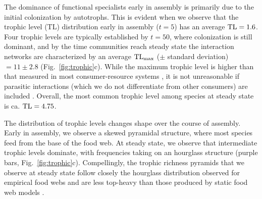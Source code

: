 \documentclass[twocolumn,preprintnumbers,amsmath,amssymb,superscriptaddress,linenumbers]{revtex4-1}
\begin{document}
\begin{bibunit}


The dominance of functional specialists early in assembly is primarily due to the initial colonization by autotrophs.
This is evident when we observe that the trophic level (TL) distribution early in assembly ($t=5$) has an average ${\rm TL}=1.6$.
Four trophic levels are typically established by $t=50$, where colonization is still dominant, and by the time communities reach steady state the interaction networks are characterized by an average ${\rm TL_{max}}$ ($\pm$ standard deviation) $=11 \pm 2.8$ (Fig.\ \ref{fig:trophic}c).
While the maximum trophic level is higher than that measured in most consumer-resource systems \cite{Williams2002}, it is not unreasonable if parasitic interactions (which we do not differentiate from other consumers) are included \cite{Lafferty2006}.
Overall, the most common trophic level among species at steady state is ca. ${\rm TL}=4.75$. %

The distribution of trophic levels changes shape over the course of assembly.
Early in assembly, we observe a skewed pyramidal structure, where most species feed from the base of the food web.
At steady state, we observe that intermediate trophic levels dominate, with frequencies taking on an hourglass structure (purple bars, Fig.\ \ref{fig:trophic}c).
Compellingly, the trophic richness pyramids that we observe at steady state follow closely the hourglass distribution observed for empirical food webs and are less top-heavy than those produced by static food web models \cite{Turney2016}.\\





\end{bibunit}
\end{document}
